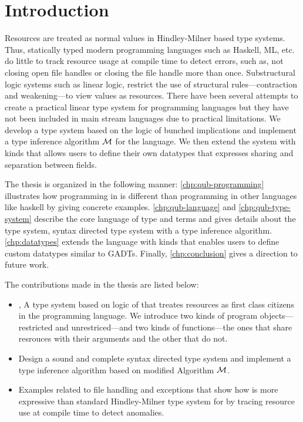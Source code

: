 \chapter{Introduction}\label{chp:intro}

Resources are treated as normal values in Hindley-Milner based type systems. Thus, statically typed modern programming languages such as
Haskell, ML, etc. do little to track resource usage at compile time to detect errors, such as, not closing open file handles
or closing the file handle more than once. Substructural logic systems such as linear logic, restrict the use of
structural rules---contraction and weakening---to view values as resources. There have been several attempts to create a practical linear
type system for programming languages but they have not been included in main stream languages due to practical limitations.
We develop a type system based on the logic of bunched implications and implement a type inference algorithm $\mathcal{M}$ for the language.
We then extend the system with kinds that allows users to define their own datatypes that expresses sharing and separation between
fields.

The thesis is organized in the following manner: \cref{chp:qub-programming} illustrates how programming in \qub{} is different
than programming in other languages like haskell by giving concrete examples. \cref{chp:qub-language} and \cref{chp:qub-type-system} describe
the core language of type and terms and gives details about the type system, syntax directed type system with a type inference algorithm.
\cref{chp:datatypes} extends the language with kinds that enables users to define custom datatypes similar to GADTs. Finally,
\cref{chp:conclusion} gives a direction to future work.

The contributions made in the thesis are listed below:
\begin{itemize}
\item \qub{}, A type system based on logic of \BI{} that treates resources as first class citizens in the programming language.
  We introduce two kinds of program objects---restricted and unrestriced---and two kinds of functions---the ones that share resrouces with
  their arguments and the other that do not.
\item Design a sound and complete syntax directed type system and implement a type inference algorithm based on modified Algorithm $\mathcal{M}$.
\item Examples related to file handling and exceptions that show how \qub{} is more expressive than standard
  Hindley-Milner type system for by tracing resource use at compile time to detect anomalies.
\end{itemize}